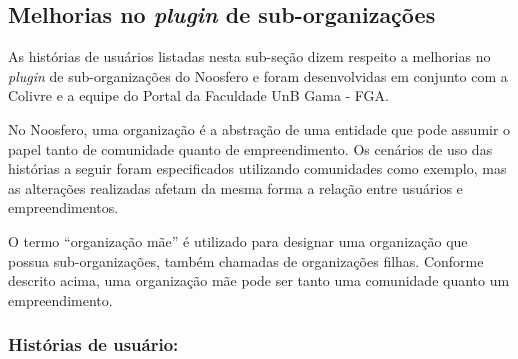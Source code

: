 \subsection{Melhorias no \textit{plugin} de sub-organizações}
\label{feature:sub_organizations}

As histórias de usuários listadas nesta sub-seção dizem respeito a melhorias
no \textit{plugin} de sub-organizações do Noosfero e foram desenvolvidas em
conjunto com a Colivre e a equipe do Portal da Faculdade UnB Gama - FGA.

No Noosfero, uma organização é a abstração de uma entidade que pode assumir
o papel tanto de comunidade quanto de empreendimento. Os cenários de uso das
histórias a seguir foram especificados utilizando comunidades como exemplo,
mas as alterações realizadas afetam da mesma forma a relação entre usuários
e empreendimentos.


O termo ``organização mãe'' é utilizado para designar uma organização que
possua sub-organizações, também chamadas de organizações filhas. Conforme
descrito acima, uma organização mãe pode ser tanto uma comunidade quanto um
empreendimento.

\subsubsection*{Histórias de usuário:}

